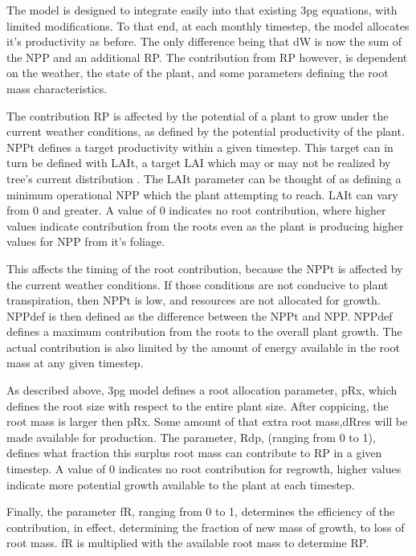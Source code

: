 \documentclass[10pt]{article}
\begin{document}
The model is designed to integrate easily into that existing \ac{3pg}
equations, with limited modifications.  To that end, at each monthly
timestep, the model allocates it's productivity as before.  The only
difference being that \acf{dW} is now the sum of the \acf{NPP} and an
additional \acf{RP}.  The contribution from \ac{RP} however, is
dependent on the weather, the state of the plant, and some parameters
defining the root mass characteristics. 

The contribution \ac{RP} is affected by the potential of a plant to
grow under the current weather conditions, as defined by the potential
productivity of the plant.  \ac{NPPt} defines a target productivity
within a given timestep.  This target can in turn be defined with
\acs{LAIt}, a target \ac{LAI} which may or may not be realized by
tree's current distribution .  The \acs{LAIt} parameter can be thought
of as defining a minimum operational \acs{NPP} which the plant
attempting to reach.  \acs{LAIt} can vary from 0 and greater.  A value
of 0 indicates no root contribution, where higher values indicate
contribution from the roots even as the plant is producing higher
values for \acs{NPP} from it's foliage.

This affects the timing of the root contribution, because the
\ac{NPPt} is affected by the current weather conditions.  If those
conditions are not conducive to plant transpiration, then \ac{NPPt} is
low, and resources are not allocated for growth.  \ac{NPPdef} is then
defined as the difference between the \ac{NPPt} and
\ac{NPP}. \ac{NPPdef} defines a maximum contribution from the roots to
the overall plant growth.  The actual contribution is also limited by
the amount of energy available in the root mass at any given timestep.

As described above, \ac{3pg} model defines a root allocation
parameter, \acs{pRx}, which defines the root size with respect to the
entire plant size.  After coppicing, the root mass is larger then
\acs{pRx}.  Some amount of that extra root mass,\acs{dRres} will be
made available for production.  The parameter, \ac{Rdp}, (ranging from
0 to 1), defines what fraction this surplus root mass can contribute
to \ac{RP} in a given timestep.  A value of 0 indicates no root
contribution for regrowth, higher values indicate more potential
growth available to the plant at each timestep.

Finally, the parameter \acf{fR}, ranging from 0 to 1, determines the
efficiency of the contribution, in effect, determining the fraction of
new mass of growth, to loss of root mass.  \acs{fR} is multiplied with
the available root mass to determine \ac{RP}.
\end{document}
